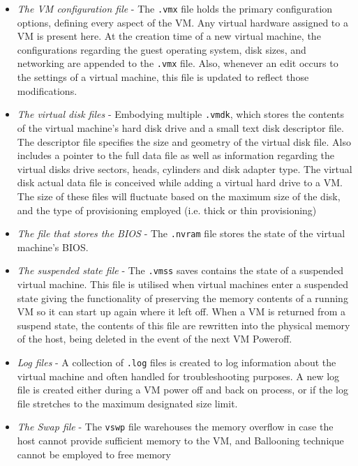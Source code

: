 \begin{itemize}
    \item \emph{The VM configuration file} - The \texttt{.vmx} file holds the primary configuration options, defining every aspect of the VM. Any virtual hardware assigned to a VM is present here. 
		At the creation time of a new virtual machine, the configurations regarding the guest operating system, disk sizes, and networking are appended to the \texttt{.vmx} file. Also, whenever an edit occurs to the settings of a virtual machine, this file is updated to reflect those modifications.
    \item \emph{The virtual disk files} - Embodying multiple \texttt{.vmdk}, which stores the contents of the virtual machine's hard disk drive and a small text disk descriptor file.
		The descriptor file specifies the size and geometry of the virtual disk file. Also includes a pointer to the full data file as well as information regarding the virtual disks drive sectors, heads, cylinders and disk adapter type.
		The virtual disk actual data file is conceived while adding a virtual hard drive to a VM. The size of these files will fluctuate based on the maximum size of the disk, and the type of provisioning employed (i.e. thick or thin provisioning)
    \item \emph{The file that stores the BIOS} - The \texttt{.nvram} file stores the state of the virtual machine's BIOS.
    \item \emph{The suspended state file} - The \texttt{.vmss} saves contains the state of a suspended virtual machine. This file is utilised when virtual machines enter a suspended state giving the functionality of preserving the memory contents of a running VM so it can start up again where it left off.  When a VM is returned from a suspend state, the contents of this file are rewritten into the physical memory of the host, being deleted in the event of the next VM Poweroff.
    \item \emph{Log files} - A collection of \texttt{.log} files is created to log information about the virtual machine and often handled for troubleshooting purposes. A new log file is created either during a VM power off and back on process, or if the log file stretches to the maximum designated size limit.
	\item \emph{The Swap file} - The \texttt{vswp} file warehouses the memory overflow in case  the host cannot provide sufficient memory to the VM, and Ballooning technique cannot be employed to free memory~\cite{VMWare_esxmem} 
\end{itemize}


